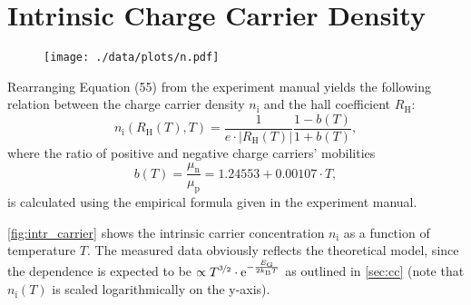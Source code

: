 
\section{Intrinsic Charge Carrier Density}
\begin{figure}
	\centering
	\texttt{[image: ./data/plots/n.pdf]}
	\label{fig:intr_carrier}
\end{figure}

Rearranging Equation (55) from the experiment manual yields the following relation between the charge carrier density $n_\text{i}$ and the hall coefficient $R_\text{H}$:
\begin{equation*}
	n_\text{i} \left(R_\text{H}\left( T \right), T \right) = \frac{1}{e \cdot \left|R_\text{H}\left(T\right)\right|} \frac{ 1 - b \left( T \right) }{ 1 + b \left( T \right) },
\end{equation*}
where the ratio of positive and negative charge carriers' mobilities
\begin{equation*}
	b \left( T \right) = \frac{\mu_\text{n}}{\mu_\text{p}} = \num{1.24553} + \num{0.00107} \cdot T,
\end{equation*}
is calculated using the empirical formula given in the experiment manual.

\autoref{fig:intr_carrier} shows the intrinsic carrier concentration $n_\text{i}$ as a function of temperature $T$.
The measured data obviously reflects the theoretical model, since the dependence is expected to be $\propto T^{\nicefrac{3}{2}}\cdot\mathrm{e}^{-\frac{E_\text{G}}{2k_\text{B}T}}$ as outlined in \autoref{sec:cc} (note that $n_\text{i}(T)$ is scaled logarithmically on the y-axis).


